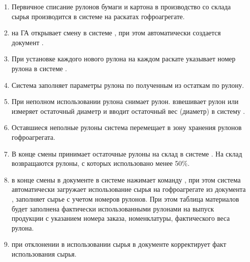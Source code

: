\begin{enumerate}
\item Первичное списание рулонов бумаги и картона в производство со склада сырья производится в системе \gofro на раскатах гофроагрегате. 
\item \gaoperator на ГА открывает смену в системе \gofro, при этом автоматически создается документ  .
\item При установке каждого нового рулона \linkoperator 
на каждом раскате указывает номер рулона в системе \gofro.
\item Система \gofro заполняет параметры рулона по полученным из \erp остаткам по рулону.


\item При неполном использовании рулона  \linkoperator снимает рулон.  \linkoperator взвешивает рулон или измеряет остаточный диаметр и вводит остаточный вес (диаметр) в систему \gofro.
\item Оставшиеся неполные рулоны система \linkoperator перемещает в зону хранения рулонов гофроагрегата.
\item В конце смены \kladovshik принимает остаточные рулоны на склад в системе \erp.
На склад возвращаются рулоны, с которых использовано менее 50\%.
\item \gaoperator в конце смены в документе  в системе \gofro нажимает команду ,   при этом система \gofro автоматически загружает использование сырья на гофроагрегате из документа , заполняет сырье с учетом номеров рулонов. При этом таблица материалов будет заполнена фактически использованными рулонами на выпуск продукции с указанием номера заказа, номенклатуры, фактического веса рулона. 
\item \gaoperator при отклонении в использовании сырья в документе  корректирует факт использования сырья.


\end{enumerate}










